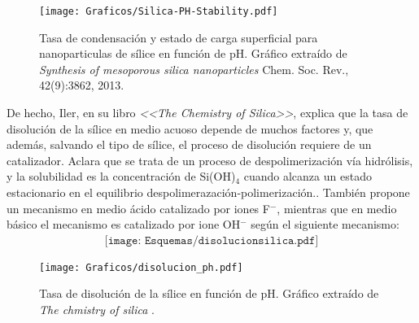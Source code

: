 			\begin{figure}[th!]
			\centering
 	       	\texttt{[image: Graficos/Silica-PH-Stability.pdf]}
	       		\caption[Tasa de condensación y estado de carga superficial]{Tasa de condensación y estado de carga superficial para nanoparticulas de sílice en función de pH. Gráfico extraído de \textit{Synthesis of mesoporous silica nanoparticles} Chem. Soc. Rev., 42(9):3862, 2013.\cite{Si-HanWu2013}}
	         	\label{fig:silica_ph}
	     		\end{figure}
			
	De hecho, Iler, en su libro \textit{<<The Chemistry of Silica>>}, explica que la tasa de disolución de la sílice en medio acuoso depende de muchos factores y, que además, salvando el tipo de sílice, el proceso de disolución requiere de un catalizador. Aclara que se trata de un proceso de despolimerización vía hidrólisis, y la solubilidad es la concentración de Si(OH)$_4$ cuando alcanza un estado estacionario en el equilibrio despolimerazación-polimerización.\cite{Iler1979}. También propone un mecanismo en medio ácido catalizado por iones F$^-$, mientras que en medio básico el mecanismo es catalizado por ione OH$^-$ según el siguiente mecanismo:
			\begin{equation}
				\begin{aligned}
				\texttt{[image: Esquemas/disolucionsilica.pdf]}
				\label{eq:disolucionsilica}
				\end{aligned}
				\end{equation}
	
			\begin{figure}[th!]
			\centering
 	       	\texttt{[image: Graficos/disolucion\_ph.pdf]}
	       		\caption[Tasa de disolución silice en función del pH]{Tasa de disolución de la sílice en función de pH. Gráfico extraído de \textit{The chmistry of silica} .\cite{Iler1979}}
	         	\label{fig:disolucion_ph}
	     		\end{figure}
	

	

